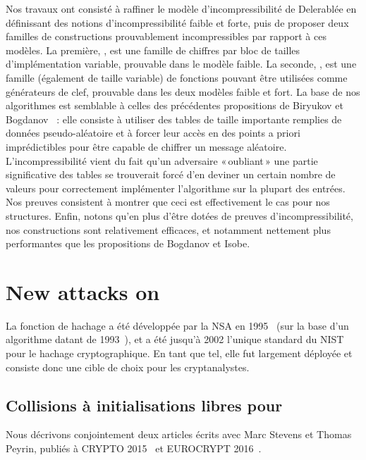 Nos travaux ont consisté à raffiner le modèle d'incompressibilité de Delerablée \etal en définissant des notions d'incompressibilité faible et forte, puis de proposer deux familles de constructions
prouvablement incompressibles par rapport à ces modèles. La première, \pc, est une famille de chiffres par bloc de tailles d'implémentation variable, prouvable dans le modèle
faible. La seconde, \cdb, est une famille (également de taille variable) de fonctions
pouvant être utilisées comme générateurs de clef, prouvable dans les deux modèles faible et fort. La base de nos algorithmes est semblable à celles des précédentes propositions de Biryukov \etal
et Bogdanov \etal~: elle consiste à utiliser des tables de taille importante remplies de données pseudo-aléatoire et à forcer leur accès en des points a priori imprédictibles pour être capable de
chiffrer un message aléatoire. L'incompressibilité vient du fait qu'un adversaire «\,oubliant\,» une partie significative des tables se trouverait forcé d'en deviner un certain nombre de valeurs
pour correctement implémenter l'algorithme sur la plupart des entrées. Nos preuves consistent à montrer que ceci est effectivement le cas pour nos structures. Enfin, notons qu'en plus d'être
dotées de preuves d'incompressibilité, nos constructions sont relativement efficaces, et notamment nettement plus performantes que les propositions de Bogdanov et Isobe.

\section[Nouvelles attaques sur la fonction de hachage \shaone]{New attacks on \shaone}

La fonction de hachage \shaone a été développée par la NSA en 1995~\cite{Nist-SHA1} (sur la base d'un algorithme datant de 1993~\cite{Nist-SHA0}), et a été jusqu'à 2002 l'unique standard du NIST pour
le hachage cryptographique. En tant que tel, elle fut largement déployée et consiste donc une cible de choix pour les cryptanalystes.

\subsection{Collisions à initialisations libres pour \shaone \cite{DBLP:conf/crypto/KarpmanPS15,DBLP:conf/eurocrypt/StevensKP16}}

Nous décrivons conjointement deux articles écrits avec Marc Stevens et Thomas Peyrin, publiés à CRYPTO 2015~\cite{DBLP:conf/crypto/KarpmanPS15} et EUROCRYPT 2016~\cite{DBLP:conf/eurocrypt/StevensKP16}.

